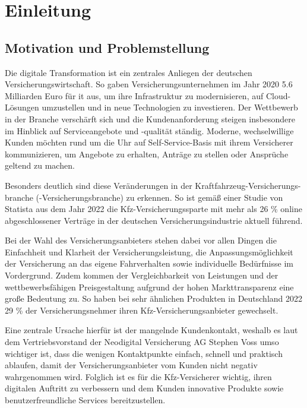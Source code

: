 \chapter{Einleitung}

\section{Motivation und Problemstellung}

Die digitale Transformation ist ein zentrales Anliegen der deutschen Versicherungswirtschaft. So gaben Versicherungsunternehmen im Jahr 2020 5.6 Milliarden Euro für \ac{it} aus, um ihre Infrastruktur zu modernisieren, auf Cloud-Lösungen umzustellen und in neue Technologien zu investieren. \autocite[Vgl.][S. 2]{PATRIK2023} Der Wettbewerb in der Branche verschärft sich und die Kundenanforderung steigen insbesondere im Hinblick auf Serviceangebote und -qualität ständig. Moderne, wechselwillige Kunden möchten rund um die Uhr auf Self-Service-Basis mit ihrem Versicherer kommunizieren, um Angebote zu erhalten, Anträge zu stellen oder Ansprüche geltend zu machen. \autocite[Vgl.][]{SCHMIDT2022} 

Besonders deutlich sind diese Veränderungen in der Kraftfahrzeug-Versicherungs-branche (-Versicherungsbranche) zu erkennen. So ist gemäß einer Studie von Statista aus dem Jahr 2022 die Kfz-Versicherungssparte mit mehr als 26 \% online abgeschlossener Verträge in der deutschen Versicherungsindustrie aktuell führend. \autocite[Vgl.][]{STATISTA2023} 

Bei der Wahl des Versicherungsanbieters stehen dabei vor allen Dingen die Einfachheit und Klarheit der Versicherungsleistung, die Anpassungsmöglichkeit der Versicherung an das eigene Fahrverhalten sowie individuelle Bedürfnisse im Vordergrund. Zudem kommen der Vergleichbarkeit von Leistungen und der wettbewerbsfähigen Preisgestaltung aufgrund der hohen Markttransparenz eine große Bedeutung zu. \autocite[Vgl.][]{MITZNER2023} So haben bei sehr ähnlichen Produkten in Deutschland 2022 29 \% der Versicherungsnehmer ihren Kfz-Versicherungsanbieter gewechselt. \autocite[Vgl.][]{ASSCOMPACTNEWSFURASSEKURANZUNDFINANZWIRTSCHAFT2023} 

Eine zentrale Ursache hierfür ist der mangelnde Kundenkontakt, weshalb es laut dem Vertriebsvorstand der Neodigital Versicherung AG Stephen Voss umso wichtiger ist, dass die wenigen Kontaktpunkte einfach, schnell und praktisch ablaufen, damit der Versicherungsanbieter vom Kunden nicht negativ wahrgenommen wird. Folglich ist es für die Kfz-Versicherer wichtig, ihren digitalen Auftritt zu verbessern und dem Kunden innovative Produkte sowie benutzerfreundliche Services bereitzustellen. \autocite[Vgl.][]{VOSS2022}

